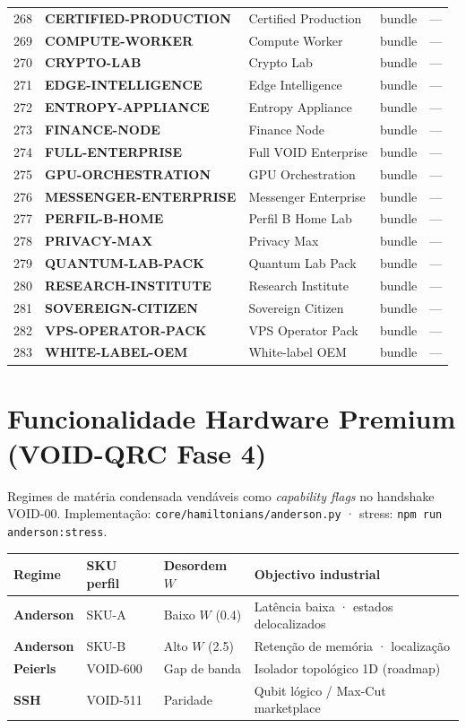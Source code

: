\documentclass[10pt,a4paper,landscape]{article}
\begin{document}
\begin{longtable}{@{}rl p{4.2cm} p{1.4cm} p{3.8cm}@{}}
268 & \textbf{CERTIFIED-PRODUCTION} & Certified Production & bundle & — \\
269 & \textbf{COMPUTE-WORKER} & Compute Worker & bundle & — \\
270 & \textbf{CRYPTO-LAB} & Crypto Lab & bundle & — \\
271 & \textbf{EDGE-INTELLIGENCE} & Edge Intelligence & bundle & — \\
272 & \textbf{ENTROPY-APPLIANCE} & Entropy Appliance & bundle & — \\
273 & \textbf{FINANCE-NODE} & Finance Node & bundle & — \\
274 & \textbf{FULL-ENTERPRISE} & Full VOID Enterprise & bundle & — \\
275 & \textbf{GPU-ORCHESTRATION} & GPU Orchestration & bundle & — \\
276 & \textbf{MESSENGER-ENTERPRISE} & Messenger Enterprise & bundle & — \\
277 & \textbf{PERFIL-B-HOME} & Perfil B Home Lab & bundle & — \\
278 & \textbf{PRIVACY-MAX} & Privacy Max & bundle & — \\
279 & \textbf{QUANTUM-LAB-PACK} & Quantum Lab Pack & bundle & — \\
280 & \textbf{RESEARCH-INSTITUTE} & Research Institute & bundle & — \\
281 & \textbf{SOVEREIGN-CITIZEN} & Sovereign Citizen & bundle & — \\
282 & \textbf{VPS-OPERATOR-PACK} & VPS Operator Pack & bundle & — \\
283 & \textbf{WHITE-LABEL-OEM} & White-label OEM & bundle & — \\
\bottomrule
\end{longtable}

\section*{Funcionalidade Hardware Premium (VOID-QRC Fase 4)}

Regimes de matéria condensada vendáveis como \emph{capability flags} no handshake VOID-00.
Implementação: \texttt{core/hamiltonians/anderson.py} · stress: \texttt{npm run anderson:stress}.

\begin{center}
\begin{tabular}{@{}llll@{}}
\toprule
Regime & SKU perfil & Desordem $W$ & Objectivo industrial \\
\midrule
\textbf{Anderson} & SKU-A & Baixo $W$ (0.4) & Latência baixa · estados delocalizados \\
\textbf{Anderson} & SKU-B & Alto $W$ (2.5) & Retenção de memória · localização \\
\textbf{Peierls} & VOID-600 & Gap de banda & Isolador topológico 1D (roadmap) \\
\textbf{SSH} & VOID-511 & Paridade & Qubit lógico / Max-Cut marketplace \\
\bottomrule
\end{tabular}
\end{center}
\end{document}
